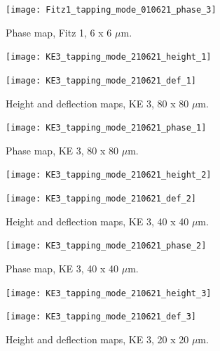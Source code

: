 \begin{figure}[H]
\centering
  \texttt{[image: Fitz1\_tapping\_mode\_010621\_phase\_3]}
\caption[Phase map, Fitz 1]{Phase map, Fitz 1, 6 x 6 $\mu$m.}
\label{fig:afm_fitz1_phase_3}
\end{figure}



\begin{figure}[H]
\centering
\begin{minipage}{.45\textwidth}
  \centering
  \texttt{[image: KE3\_tapping\_mode\_210621\_height\_1]}
\end{minipage}
\begin{minipage}{.45\textwidth}
  \centering
  \texttt{[image: KE3\_tapping\_mode\_210621\_def\_1]}
\end{minipage}
\caption[Height and deflection maps, KE 3]{Height and deflection maps, KE 3, 80 x 80 $\mu$m.}
\label{fig:afm_ke3_height_def_1}
\end{figure}

\begin{figure}[H]
\centering
  \texttt{[image: KE3\_tapping\_mode\_210621\_phase\_1]}
\caption[Phase map, KE 3]{Phase map, KE 3, 80 x 80 $\mu$m.}
\label{fig:afm_ke3_phase_1}
\end{figure}


\begin{figure}[H]
\centering
\begin{minipage}{.45\textwidth}
  \centering
  \texttt{[image: KE3\_tapping\_mode\_210621\_height\_2]}
\end{minipage}
\begin{minipage}{.45\textwidth}
  \centering
  \texttt{[image: KE3\_tapping\_mode\_210621\_def\_2]}
\end{minipage}
\caption[Height and deflection maps, KE 3]{Height and deflection maps, KE 3, 40 x 40 $\mu$m.}
\label{fig:afm_ke3_height_def_2}
\end{figure}

\begin{figure}[H]
\centering
  \texttt{[image: KE3\_tapping\_mode\_210621\_phase\_2]}
\caption[Phase map, KE 3]{Phase map, KE 3, 40 x 40 $\mu$m.}
\label{fig:afm_ke3_phase_2}
\end{figure}


\begin{figure}[H]
\centering
\begin{minipage}{.45\textwidth}
  \centering
  \texttt{[image: KE3\_tapping\_mode\_210621\_height\_3]}
\end{minipage}
\begin{minipage}{.45\textwidth}
  \centering
  \texttt{[image: KE3\_tapping\_mode\_210621\_def\_3]}
\end{minipage}
\caption[Height and deflection maps, KE 3]{Height and deflection maps, KE 3, 20 x 20 $\mu$m.}
\label{fig:afm_ke3_height_def_3}
\end{figure}

